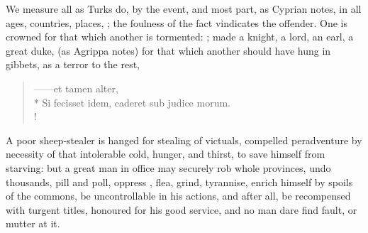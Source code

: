 
We measure all as Turks do, by the event, and most part, as Cyprian notes, in
all ages, countries, places, ; the foulness of the fact vindicates the offender.
One is crowned for that which another is tormented:
; made a knight, a lord, an
earl, a great duke, (as Agrippa notes) for that which
another should have hung in gibbets, as a terror to the rest,

\begin{latin}
\begin{verse}%
------et tamen alter,\\*
Si fecisset idem, caderet sub judice morum.\\!
\end{verse}%
\end{latin}

A poor sheep-stealer is hanged for stealing of victuals, compelled peradventure
by necessity of that intolerable cold, hunger, and thirst, to save himself from
starving: but a great man in office may securely rob whole
provinces, undo thousands, pill and poll, oppress , flea, grind,
tyrannise, enrich himself by spoils of the commons, be uncontrollable in his
actions, and after all, be recompensed with turgent titles, honoured for his
good service, and no man dare find fault, or mutter at it.


